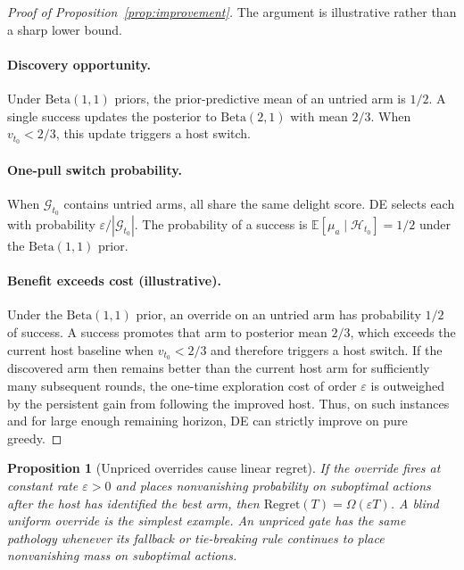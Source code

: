 \documentclass{article}
\newtheorem{proposition} {Proposition}
\newcommand{\Gc}{\mathcal{G}}
\newcommand{\Hc}{\mathcal{H}}
\newcommand{\E}{\mathbb{E}}
\begin{document}
\begin{proof}[Proof of Proposition~\ref{prop:improvement}]
The argument is illustrative rather than a sharp lower bound.

\paragraph{Discovery opportunity.}
Under $\mathrm{Beta}(1,1)$ priors, the prior-predictive mean of an untried arm is $1/2$.
A single success updates the posterior to $\mathrm{Beta}(2,1)$ with mean $2/3$.
When $v_{t_0} < 2/3$, this update triggers a host switch.

\paragraph{One-pull switch probability.}
When $\Gc_{t_0}$ contains untried arms, all share the same delight score.
DE selects each with probability $\varepsilon/|\Gc_{t_0}|$.
The probability of a success is $\E[\mu_a \mid \Hc_{t_0}] = 1/2$ under the $\mathrm{Beta}(1,1)$ prior.

\paragraph{Benefit exceeds cost (illustrative).}
Under the $\mathrm{Beta}(1,1)$ prior, an override on an untried arm has probability $1/2$ of success.
A success promotes that arm to posterior mean $2/3$, which exceeds the current host baseline when $v_{t_0} < 2/3$ and therefore triggers a host switch.
If the discovered arm then remains better than the current host arm for sufficiently many subsequent rounds, the one-time exploration cost of order $\varepsilon$ is outweighed by the persistent gain from following the improved host.
Thus, on such instances and for large enough remaining horizon, DE can strictly improve on pure greedy.
\end{proof}

\begin{proposition}[Unpriced overrides cause linear regret]
\label{prop:nogate}
If the override fires at constant rate $\varepsilon>0$ and places nonvanishing probability on suboptimal actions after the host has identified the best arm, then $\mathrm{Regret}(T) = \Omega(\varepsilon T)$.
A blind uniform override is the simplest example.
An unpriced gate has the same pathology whenever its fallback or tie-breaking rule continues to place nonvanishing mass on suboptimal actions.
\end{proposition}
\end{document}
